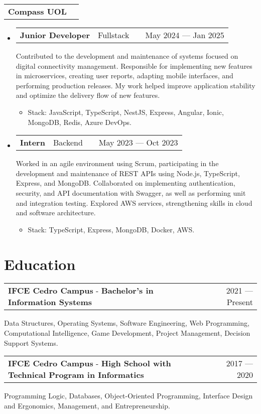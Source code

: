 \documentclass[a4paper,12pt]{article}
\makeatletter
\newenvironment{joblong}[2]{
  \begin{tabularx}{\linewidth}{@{}l X@{}}
    \textbf{#1} & \if\relax\detokenize{#2}\relax\else #2\fi \\
  \end{tabularx}
  \begin{itemize}[leftmargin=1.5em,label={},itemsep=5pt,topsep=0pt]
}{
  \end{itemize}
}
\newenvironment{role}[3]{
  \item
  \begin{tabularx}{\linewidth}{@{}l X r@{}}
    {\small\textbf{#1}}\ \ {\footnotesize\if\relax\detokenize{#3}\relax\else #3\fi} & \hfill & #2 \\
  \end{tabularx}
    }
    {
    }
\newenvironment{education}[3]
    {
    \begin{tabularx}{\linewidth}{@{}l X r@{}}
    \textbf{#1} - \textbf{#2} & \hfill &  #3 \\[3.75pt]
    \end{tabularx}
    }
    {
    }
\makeatother
\begin{document}
\begin{joblong}{Compass UOL}{}
  \begin{role}{Junior Developer}{May 2024 — Jan 2025}{Fullstack}
    Contributed to the development and maintenance of systems focused on digital connectivity management. Responsible for implementing new features in microservices, creating user reports, adapting mobile interfaces, and performing production releases. My work helped improve application stability and optimize the delivery flow of new features.
    \begin{itemize}[nosep,after=\strut, leftmargin=0em, itemsep=3pt,label={}]
        \item Stack: JavaScript, TypeScript, NestJS, Express, Angular, Ionic, MongoDB, Redis, Azure DevOps.
    \end{itemize}
  \end{role}

  \begin{role}{Intern}{May 2023 — Oct 2023}{Backend}
    Worked in an agile environment using Scrum, participating in the development and maintenance of REST APIs using Node.js, TypeScript, Express, and MongoDB. Collaborated on implementing authentication, security, and API documentation with Swagger, as well as performing unit and integration testing. Explored AWS services, strengthening skills in cloud and software architecture.
    \begin{itemize}[nosep,after=\strut, leftmargin=0em, itemsep=3pt,label={}]
        \item Stack: TypeScript, Express, MongoDB, Docker, AWS.
    \end{itemize}
  \end{role}
\end{joblong}
  

\section{Education}
    
\begin{education}{IFCE Cedro Campus}{Bachelor’s in Information Systems}{2021 — Present}
Data Structures, Operating Systems, Software Engineering, Web Programming, Computational Intelligence, Game Development, Project Management, Decision Support Systems.
\end{education}

\begin{education}{IFCE Cedro Campus}{High School with Technical Program in Informatics}{2017 — 2020}
Programming Logic, Databases, Object-Oriented Programming, Interface Design and Ergonomics, Management, and Entrepreneurship.
\end{education}
\end{document}

